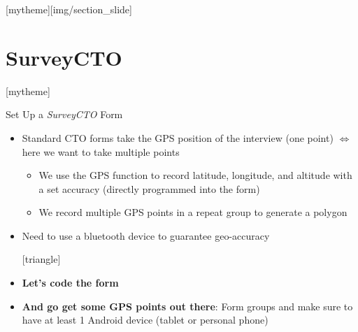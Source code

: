 \documentclass[aspectratio=169]{beamer}
\newcommand{\sectionpic}[2]{
	\setbeamertemplate{section page}[mytheme][#2]
	\section{#1}
	\setbeamertemplate{section page}[mytheme]
}
\begin{document}
\sectionpic{SurveyCTO}{img/section_slide}

\begin{frame}{Set Up a \textit{SurveyCTO} Form}

\begin{itemize}
    \item Standard CTO forms take the GPS position of the interview (one point) $\Leftrightarrow$ here we want to take multiple points
    \begin{itemize}
        \item We use the \alert{GPS function} to record latitude, longitude, and altitude with a set accuracy (directly programmed into the form)
        \item We record multiple GPS points in a \alert{repeat} group to generate a polygon
    \end{itemize}
    \item Need to use a bluetooth device to guarantee geo-accuracy %
   
    \vspace{0.5cm}
    
    [triangle]

    \item \textbf{Let's code the form} %
    \item \textbf{And go get some GPS points out there}:  Form groups and make sure to have at least 1 Android device (tablet or personal phone)
    
\end{itemize}

\end{frame}

\end{document}
